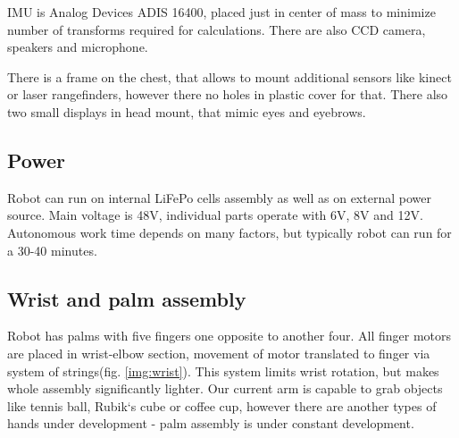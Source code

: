 \documentclass[letterpaper, 10 pt, conference]{ieeeconf}  %
\begin{document}
IMU is Analog Devices ADIS 16400, placed just in center of mass to minimize
number of transforms required for calculations. There are also CCD camera,
speakers and microphone.

There is a frame on the chest, that allows to mount additional sensors like
kinect or laser rangefinders, however there no holes in plastic cover for that.
There also two small displays in head mount, that mimic eyes and eyebrows.

\subsection{Power}
Robot can run on internal LiFePo cells assembly as well as on external power
source. Main voltage is 48V, individual parts operate with 6V, 8V and 12V.
Autonomous work time depends on many factors, but typically robot can run for a
30-40 minutes.
 
\subsection{Wrist and palm assembly}
Robot has palms with five fingers one opposite to another four. All
finger motors are placed in wrist-elbow section, movement of motor translated to finger
via system of strings(fig. \ref{img:wrist}). This system limits wrist rotation,
but makes whole assembly significantly lighter. Our current arm is capable to grab objects like
tennis ball, Rubik`s cube or coffee cup, however there are
another types of hands under development - palm assembly is under
constant development.
\end{document}
